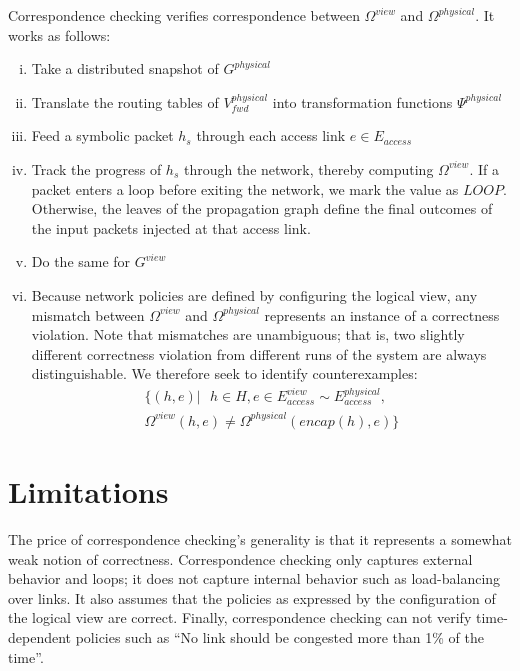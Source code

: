 \documentclass{sig-alternate-10pt}
\begin{document}
Correspondence checking verifies
correspondence between $\Omega^{view}$ and $\Omega^{physical}$.
It works as follows:
\begin{enumerate}[i.]
\item Take a distributed snapshot of $G^{physical}$ \cite{distributedsnapshots}
\item Translate the routing tables of $V_{fwd}^{physical}$ into transformation
functions $\Psi^{physical}$
\item Feed a symbolic packet $h_s$ through each access link $e \in E_{access}$
\item Track the progress of $h_s$ through the network, thereby computing
$\Omega^{view}$. If a packet
enters a loop before exiting the network, we mark the value as
$LOOP$. Otherwise,
the leaves of the propagation graph define the final outcomes of the input
packets injected at that access link.
\item Do the same for $G^{view}$
\item Because network policies are defined by
configuring the logical view, any mismatch between $\Omega^{view}$ and $\Omega^{physical}$
represents an instance of a correctness violation. Note that mismatches are
unambiguous; that is, two slightly different correctness violation from
different runs of the system are always distinguishable.
We therefore seek to identify counterexamples:
\begin{align*}
 \{ (h,e) |\text{ } h \in H, e \in E^{view}_{access} \sim
 E^{physical}_{access}, \\
 \Omega^{view}(h,e) \neq  \Omega^{physical}(encap(h),e) \}
\end{align*}
\end{enumerate}


\section{Limitations}

The price of correspondence checking's generality is that it represents
a somewhat weak notion of
correctness. Correspondence checking only captures external behavior and
loops; it does not capture internal behavior such as load-balancing
over links. It also assumes that the policies as expressed by the
configuration of the logical view are correct. Finally, correspondence
checking can not verify
time-dependent policies such as ``No link should be congested more than 1\% of
the time''.

\scriptsize



%
\end{document}
